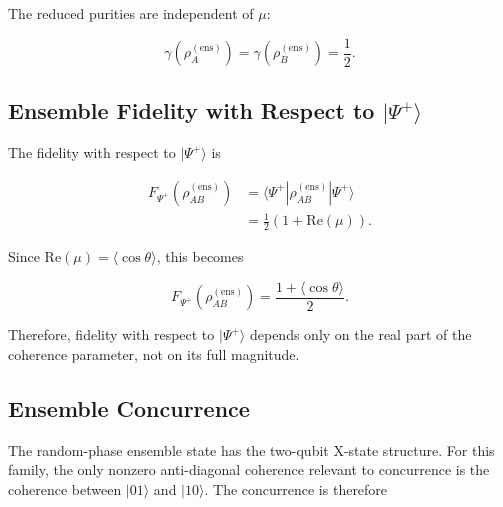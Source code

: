 The reduced purities are independent of \( \mu \):

\begin{equation}
\gamma\left(\rho_A^{(\mathrm{ens})}\right)
=
\gamma\left(\rho_B^{(\mathrm{ens})}\right)
=
\frac{1}{2}.
\label{eq:d5_random_phase_ensemble_reduced_purities}
\end{equation}


\subsection{Ensemble Fidelity with Respect to \texorpdfstring{\( |\Psi^+\rangle \)}{|Psi+>}}

The fidelity with respect to \( |\Psi^+\rangle \) is

\begin{align}
F_{\Psi^+}\left(\rho_{AB}^{(\mathrm{ens})}\right)
&=
\langle\Psi^+|\rho_{AB}^{(\mathrm{ens})}|\Psi^+\rangle
\nonumber
\\
&=
\frac{1}{2}
\left(
1+\mathrm{Re}(\mu)
\right).
\label{eq:d5_random_phase_ensemble_fidelity_mu}
\end{align}

Since \( \mathrm{Re}(\mu)=\langle\cos\theta\rangle \), this becomes

\begin{equation}
F_{\Psi^+}\left(\rho_{AB}^{(\mathrm{ens})}\right)
=
\frac{1+\langle\cos\theta\rangle}{2}.
\label{eq:d5_random_phase_ensemble_fidelity_cosine}
\end{equation}

Therefore, fidelity with respect to \( |\Psi^+\rangle \) depends only on the real part of the coherence parameter, not on its full magnitude.


\subsection{Ensemble Concurrence}

The random-phase ensemble state has the two-qubit X-state structure. For this family, the only nonzero anti-diagonal coherence relevant to concurrence is the coherence between \( |01\rangle \) and \( |10\rangle \). The concurrence is therefore


